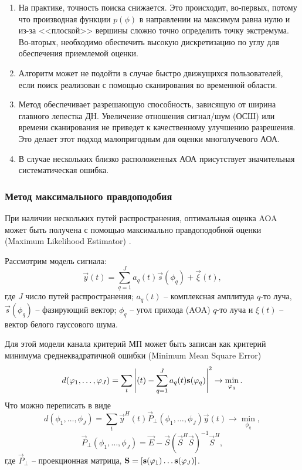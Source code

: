 \begin{enumerate}
    \item На практике, точность поиска снижается.
          Это происходит, во-первых,  потому что производная функции $p(\phi)$
          в направлении на максимум равна нулю и из-за <<плоской>> вершины сложно
          точно определить точку экстремума. Во-вторых, необходимо
          обеспечить высокую дискретизацию по углу для обеспечения приемлемой
          оценки.
    \item Алгоритм может не подойти в случае быстро движущихся пользователей, если поиск реализован с помощью сканирования во временной области.
    \item Метод обеспечивает разрешающую способность, зависящую
          от ширина главного лепестка ДН. Увеличение отношения сигнал/шум (ОСШ) или времени
          сканирования не приведет к качественному улучшению разрешения.  Это делает
          этот подход малопригодным для оценки многолучевого АОА.
    \item В случае нескольких близко расположенных АОА присутствует
          значительная систематическая ошибка.
\end{enumerate}


\subsubsection{Метод максимального правдоподобия}%
\label{sub:metod_maksimal_nogo_pravdopodobiia}
\label{sec:MLE-algorithm}
При наличии нескольких путей распространения, оптимальная оценка AOA может быть
получена с помощью максимально правдоподобной оценки (Maximum Likelihood
Estimator) \cite{Tuncer2009}.  

Рассмотрим модель сигнала:
\begin{equation}
    \label{eq:3.8}
    \vec y(t) = \sum\limits_{q=1}^{J} a_q(t)\vec s(\phi_q) + \vec \xi(t),
\end{equation}
где $J$ число путей распространения; $a_q(t)$ -- комплексная амплитуда $q$-то
луча, $\vec s(\phi_q)$ -- фазирующий вектор;  $\phi_q$ -- угол прихода (AOA) $q$-то
луча и $\xi(t)$ -- вектор белого гауссового шума.

Для этой модели канала критерий МП может быть записан как критерий минимума
среднеквадратичной ошибки (Minimum Mean Square Error)
\begin{equation}
    d(\phi_1, \hdots, \phi_J) = \sum\limits_{t}^{} \abs{\vec(t) -
        \sum\limits_{q=1}^{J} a_q(t) \vec s(\phi_q)}^2 \to \min_{\phi_q}.
\end{equation}
Что можно переписать в виде
\begin{equation}
    \label{eq:3.10}
    d(\phi_1, \hdots, \phi_J) = \sum\limits_{t}^{} \vec y^H(t) \vec
    P_\perp(\phi_1, \hdots, \phi_J) \vec y(t) \to \min_{\phi_q},
\end{equation}
\begin{equation}
    \vec P_\perp(\phi_1, \hdots, \phi_J) = \vec E - \vec S(\vec S^H \vec S)^{-1}
    \vec S^H,
\end{equation}
где $\vec P_\perp$ -- проекционная матрица, 
$\vec S = \qty[\vec s(\phi_1) \dots \vec s (\phi_J)]$. 

